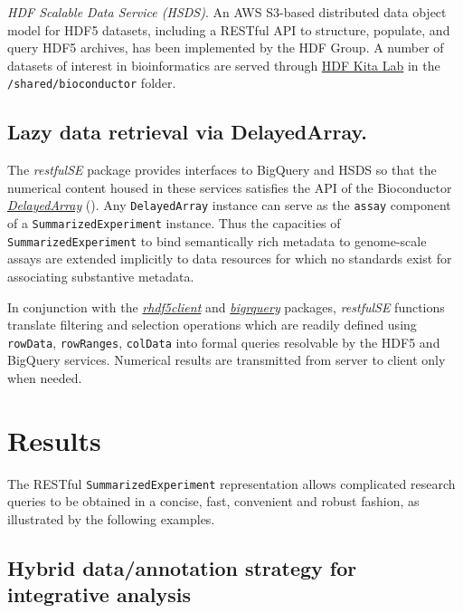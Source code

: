 \documentclass[9pt,a4paper,]{extarticle}
\begin{document}
\emph{HDF Scalable Data Service (HSDS)}. An AWS S3-based
distributed data object model for
HDF5 datasets, including a
RESTful API to structure, populate, and query HDF5 archives,
has been implemented by the HDF Group.
A number of datasets of interest in bioinformatics
are served through \href{https://www.hdfgroup.org/solutions/hdf-kita/}{HDF Kita Lab}
in the \texttt{/shared/bioconductor} folder.

\subsection{Lazy data retrieval via DelayedArray.}\label{lazy-data-retrieval-via-delayedarray.}

The \textit{restfulSE} package provides interfaces to
BigQuery and HSDS so that
the numerical content housed in these services
satisfies the API of the Bioconductor \emph{\href{https://bioconductor.org/packages/3.9/DelayedArray}{DelayedArray}}
(\citet{Pages2018}).
Any \texttt{DelayedArray} instance can serve as the \texttt{assay}
component of a \texttt{SummarizedExperiment} instance. Thus the
capacities of \texttt{SummarizedExperiment} to bind semantically
rich metadata to genome-scale assays are extended implicitly to
data resources for which no standards exist for
associating substantive metadata.

In conjunction with the \emph{\href{https://bioconductor.org/packages/3.9/rhdf5client}{rhdf5client}} and
\emph{\href{https://CRAN.R-project.org/package=bigrquery}{bigrquery}} packages,
\textit{restfulSE} functions translate filtering and selection operations
which are readily defined using \texttt{rowData}, \texttt{rowRanges},
\texttt{colData} into formal queries resolvable by the HDF5 and
BigQuery services. Numerical results are transmitted from
server to client only when needed.

\section{Results}\label{results}

The RESTful \texttt{SummarizedExperiment} representation
allows complicated research queries to be obtained in a concise,
fast, convenient and robust fashion, as illustrated by
the following examples.

\subsection{Hybrid data/annotation strategy for integrative analysis}\label{hybrid-dataannotation-strategy-for-integrative-analysis}
\end{document}
